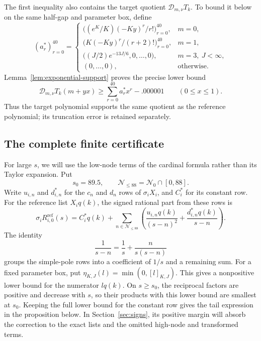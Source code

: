 The first inequality also contains the target quotient
$\mathcal D_{m,\nu}T_k$.  To bound it below on the same half-gap and
parameter box, define
\begin{equation}\label{eq:target-support}
 (a_r^*)_{r=0}^{40}=
 \begin{cases}
 \bigl((e^K/K)(-Ky)^r/r!\bigr)_{r=0}^{40},&m=0,\\
 \bigl(K(-Ky)^r/(r+2)!\bigr)_{r=0}^{40},&m=1,\\
 \bigl((J/2)e^{-13J/6},0,\ldots,0\bigr),&m=3,\ J<\infty,\\
 (0,\ldots,0),&\text{otherwise}.
 \end{cases}
\end{equation}
Lemma~\ref{lem:exponential-support} proves the precise lower bound
\[
 \mathcal D_{m,\nu}T_k(m+yx)
 \ge\sum_{r=0}^{40}a_r^*x^r-.000001\qquad(0\le x\le1).
\]
Thus the target polynomial supports the same quotient as the reference
polynomial; its truncation error is retained separately.

\subsection{The complete finite certificate}

For large $s$, we will use the low-node terms of the cardinal formula
rather than its Taylor expansion.  Put
\[
 s_0=89.5,\qquad \mathcal N_{\le88}=\mathcal N_0\cap[0,88].
\]
Write $u_{i,n}$ and $d^*_{i,n}$ for the $c_n$ and $d_n$ rows of
$\sigma_iX_i$, and $C_i^*$ for its constant row.  For the reference list
$X_iq(k)$, the signed rational part from these rows is
\[
 \sigma_iR_{i,0}^{\mathrm{ref}}(s)
 =C_i^*q(k)+\sum_{n\in\mathcal N_{\le88}}
 \left(\frac{u_{i,n}q(k)}{(s-n)^2}
       +\frac{d^*_{i,n}q(k)}{s-n}\right).
\]
The identity
\[
 \frac1{s-n}=\frac1s+\frac{n}{s(s-n)}
\]
groups the simple-pole rows into a coefficient of $1/s$ and a remaining
sum.  For a fixed parameter box, put
$\eta_{K,J}(l)=\min(0,[l]_{K,J})$.  This gives a nonpositive lower bound
for the numerator $lq(k)$.  On $s\ge s_0$, the reciprocal factors are
positive and decrease with $s$, so their products with this lower bound
are smallest at $s_0$.  Keeping the full lower bound for the constant row
gives the tail expression in the proposition below.  In
Section~\ref{sec:signs}, its positive margin will absorb the correction
to the exact lists and the omitted high-node and transformed terms.

